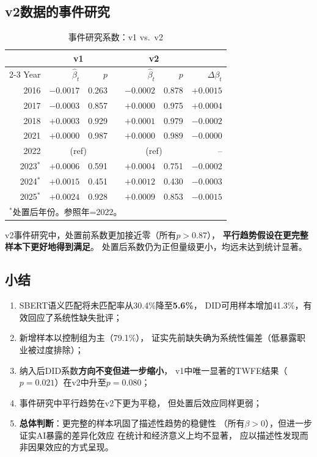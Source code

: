 \documentclass[12pt,a4paper]{ctexart}
\begin{document}
\subsection{v2数据的事件研究}

\begin{table}[h!]
\centering
\caption{事件研究系数：v1 vs.\ v2}
\label{tab:event_study_v1v2}
\begin{tabular}{r rr c rr r}
\toprule
& \multicolumn{2}{c}{v1} && \multicolumn{2}{c}{v2} & \\
\cmidrule{2-3} \cmidrule{5-6}
Year & $\hat{\beta}_t$ & $p$ && $\hat{\beta}_t$ & $p$ & $\Delta\beta_t$ \\
\midrule
2016 & $-0.0017$ & 0.263 && $-0.0002$ & 0.878 & $+0.0015$ \\
2017 & $-0.0003$ & 0.857 && $+0.0000$ & 0.975 & $+0.0004$ \\
2018 & $+0.0003$ & 0.929 && $+0.0001$ & 0.979 & $-0.0002$ \\
2021 & $+0.0000$ & 0.987 && $+0.0000$ & 0.989 & $-0.0000$ \\
2022 & \multicolumn{2}{c}{(ref)} && \multicolumn{2}{c}{(ref)} & -- \\
2023$^\ast$ & $+0.0006$ & 0.591 && $+0.0004$ & 0.751 & $-0.0002$ \\
2024$^\ast$ & $+0.0015$ & 0.451 && $+0.0012$ & 0.430 & $-0.0003$ \\
2025$^\ast$ & $+0.0024$ & 0.928 && $+0.0009$ & 0.853 & $-0.0015$ \\
\bottomrule
\multicolumn{7}{l}{\footnotesize $^\ast$处置后年份。参照年=2022。} \\
\end{tabular}
\end{table}

v2事件研究中，处置前系数更加接近零（所有$p>0.87$），
\textbf{平行趋势假设在更完整样本下更好地得到满足}。
处置后系数仍为正但量级更小，均远未达到统计显著。

\subsection{小结}

\begin{enumerate}
\item SBERT语义匹配将未匹配率从30.4\%降至\textbf{5.6\%}，
      DID可用样本增加41.3\%，有效回应了系统性缺失批评；
\item 新增样本以控制组为主（79.1\%），
      证实先前缺失确为系统性偏差（低暴露职业被过度排除）；
\item 纳入后DID系数\textbf{方向不变但进一步缩小}，
      v1中唯一显著的TWFE结果（$p=0.021$）在v2中升至$p=0.080$；
\item 事件研究中平行趋势在v2下更为平稳，
      但处置后效应同样更弱；
\item \textbf{总体判断}：更完整的样本巩固了描述性趋势的稳健性
      （所有$\beta>0$），但进一步证实AI暴露的差异化效应
      在统计和经济意义上均不显著，
      应以描述性发现而非因果效应的方式呈现。
\end{enumerate}
\end{document}
